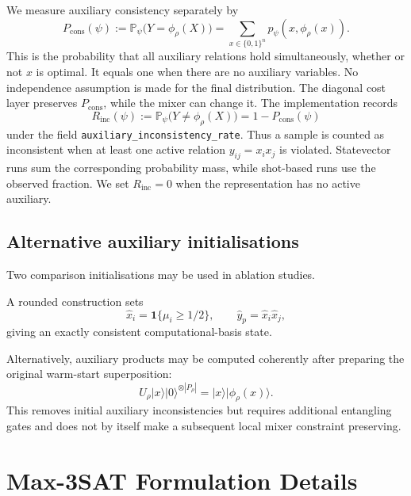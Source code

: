 \documentclass[a4paper,onecolumn,11pt,unpublished]{quantumarticle}
\theoremstyle{remark}
\begin{document}
We measure auxiliary consistency separately by
\begin{equation}
P_{\mathrm{cons}}(\psi)
:=\mathbb P_\psi\!\bigl(Y=\phi_\rho(X)\bigr)
=\sum_{x\in\{0,1\}^n}p_\psi(x,\phi_\rho(x)).
\label{eq:pcons}
\end{equation}
This is the probability that all auxiliary relations hold
simultaneously, whether or not $x$ is optimal. It equals one when
there are no auxiliary variables. No independence assumption is
made for the final distribution. The diagonal cost layer preserves
$P_{\mathrm{cons}}$, while the mixer can change it.  The implementation
records
\begin{equation}
R_{\mathrm{inc}}(\psi)
:=\mathbb P_\psi\!\bigl(Y\neq\phi_\rho(X)\bigr)
=1-P_{\mathrm{cons}}(\psi)
\label{eq:rinc}
\end{equation}
under the field \nolinkurl{auxiliary_inconsistency_rate}.  Thus a sample
is counted as inconsistent when at least one active relation
$y_{ij}=x_i x_j$ is violated.  Statevector runs sum the corresponding
probability mass, while shot-based runs use the observed fraction.  We set
$R_{\mathrm{inc}}=0$ when the representation has no active auxiliary.

\subsection{Alternative auxiliary initialisations}
\label{app:alternative-warm-starts}

Two comparison initialisations may be used in ablation studies.

A rounded construction sets
\[
\hat x_i=\mathbf 1\{\mu_i\ge 1/2\},
\qquad
\hat y_p=\hat x_i\hat x_j,
\]
giving an exactly consistent computational-basis state.

Alternatively, auxiliary products may be computed coherently after preparing
the original warm-start superposition:
\[
U_\rho
|x\rangle|0\rangle^{\otimes |P_\rho|}
=
|x\rangle|\phi_\rho(x)\rangle .
\]
This removes initial auxiliary inconsistencies but requires additional
entangling gates and does not by itself make a subsequent local mixer
constraint preserving.




\section{Max-3SAT Formulation Details}
\label{app:max3sat}
\end{document}
